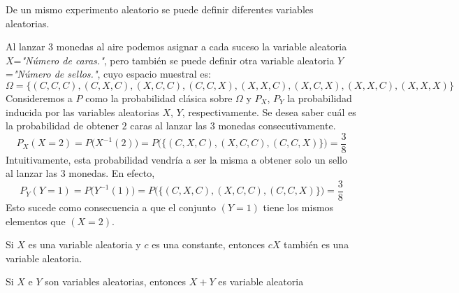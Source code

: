 De un mismo experimento aleatorio se puede definir diferentes variables aleatorias.
\begin{Ejm}
    Al lanzar $3$ monedas al aire podemos asignar a cada suceso la variable aleatoria $X$=\textit{"Número de caras."}, pero también se puede definir otra variable aleatoria $Y$=\textit{"Número de sellos."}, cuyo espacio muestral es:
    $$\Omega = \{(C,C,C),(C,X,C), (X,C,C), (C,C,X), (X,X,C), (X,C,X), (X,X,C), (X,X,X)\}$$
Consideremos a $P$ como la probabilidad clásica sobre $\Omega$ y $P_X$, $P_Y$ la probabilidad inducida por las variables aleatorias $X$, $Y$, respectivamente.
Se desea saber cuál es la probabilidad de obtener $2$ caras al lanzar las $3$ monedas consecutivamente.
$$P_{X}(X=2)= P\big(X^{-1}(2)\big)= P\big(\big\{(C,X,C), (X,C,C), (C,C,X)\big\}\big)=\frac{3}{8}$$
Intuitivamente, esta probabilidad vendría a ser la misma a obtener solo un sello al lanzar las $3$ monedas.
En efecto,
$$P_{Y}(Y=1)= P\big(Y^{-1}(1)\big)= P\big(\big\{(C,X,C), (X,C,C), (C,C,X)\big\}\big)=\frac{3}{8}$$
Esto sucede como consecuencia a que el conjunto $(Y=1)$ tiene los mismos elementos que $(X=2)$.
\end{Ejm}
\begin{Prop}
    Si $X$ es una variable aleatoria y $c$ es una constante, entonces $c X$ también es una variable aleatoria.
    \label{prop-variableAl-cXesVA}
\end{Prop}
\begin{Prop}
    Si $X$ e $Y$ son variables aleatorias, entonces $X+Y$ es variable aleatoria
    \label{prop-variableAl-X+YesVA}
\end{Prop}
\begin{comment}
\begin{Def}
    Sea los espacios de probabilidad $(\Omega_1,\thinspace\mathscr{F}_1,\thinspace P_1)$, $(\Omega_2,\thinspace\mathscr{F}_2,\thinspace P_2)$.
    Un vector aleatorio es una función $X:\Omega_1\rightarrow\Omega_2$ tal que para cualquier conjunto B en $\mathscr{F}_2$, se cumple que la imagen inversa $X^{-1}(B)$ es un elemento de $\mathscr{F}_1$.
\end{Def}
Dado entonces que un vector aleatorio es una función de $\Omega$ en $\R^n$, éste
puede representar de la forma $X=(X_1,\ldots, X_n)$ en donde cada coordenada es una función de $\Omega$ en $\R$.
\begin{Prop}
    Una función $(X_1 , . . . , X_n):\Omega\rightarrow R^n$ es un vector aleatorio si, y sólo si, cada coordenada es una variable aleatoria.
\end{Prop}
El resultado es análogo al caso unidimensional y puede extenderse al caso de $n$ dimensiones.
En la mayoría de los casos, las definiciones y resultados son fácilmente extendidos a dimensiones mayores.\\
\begin{Obs}
    El vector aleatorio $(A,\thinspace B)$ se interpreta cuan probable es que suceda A y B a la vez. Es decir $P(A,\thinspace B)=P(A\cap B)$.
\end{Obs}
\end{comment}

